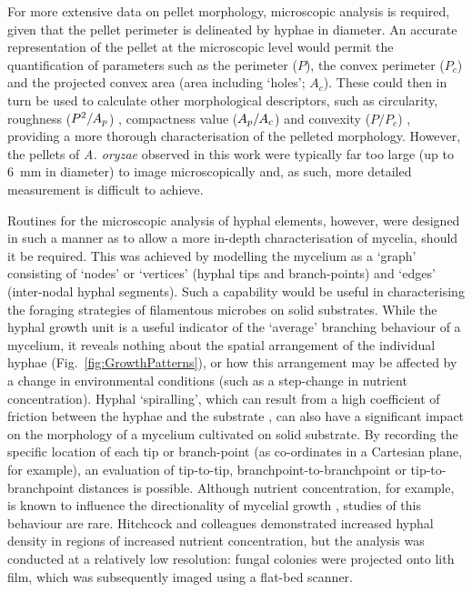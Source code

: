 For more extensive data on pellet morphology, microscopic analysis is required, given that the pellet perimeter is delineated by hyphae  in diameter. An accurate representation of the pellet at the microscopic level would permit the quantification of parameters such as the perimeter ($P$), the convex perimeter ($P_c$) and the projected convex area (area including \lq holes'; $A_c$). These could then in turn be used to calculate other morphological descriptors, such as circularity, roughness ($P^2/A_p$) \cite{higashiyama1999}, compactness value ($A_p/A_c$) \cite{muller2002,jppark2002,muller2003} and convexity ($P/P_c$) \cite{papagianni2002,papagianni2004}, providing a more thorough characterisation of the pelleted morphology. However, the pellets of \emph{A. oryzae} observed in this work were typically far too large (up to 6~mm in diameter) to image microscopically and, as such, more detailed measurement is difficult to achieve.

Routines for the microscopic analysis of hyphal elements, however, were designed in such a manner as to allow a more in-depth characterisation of mycelia, should it be required. This was achieved by modelling the mycelium as a \lq graph' consisting of \lq nodes' or \lq vertices' (hyphal tips and branch-points) and \lq edges' (inter-nodal hyphal segments). Such a capability would be useful in characterising the foraging strategies of filamentous microbes on solid substrates. While the hyphal growth unit is a useful indicator of the \lq average' branching behaviour of a mycelium, it reveals nothing about the spatial arrangement of the individual hyphae (Fig.~\ref{fig:GrowthPatterns}), or how this arrangement may be affected by a change in environmental conditions (such as a step-change in nutrient concentration). Hyphal \lq spiralling', which can result from a high coefficient of friction between the hyphae and the substrate \cite{prosser1995}, can also have a significant impact on the morphology of a mycelium cultivated on solid substrate. By recording the specific location of each tip or branch-point (as co-ordinates in a Cartesian plane, for example), an evaluation of tip-to-tip, branchpoint-to-branchpoint or tip-to-branchpoint distances is possible. Although nutrient concentration, for example, is known to influence the directionality of mycelial growth \cite{prosser1995}, studies of this behaviour are rare. Hitchcock and colleagues demonstrated increased hyphal density in regions of increased nutrient concentration, but the analysis was conducted at a relatively low resolution: fungal colonies were projected onto lith film, which was subsequently imaged using a flat-bed scanner.

